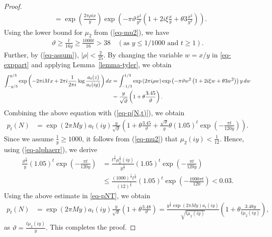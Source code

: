 \documentclass[11pt]{amsart}
\theoremstyle{plain}
\numberwithin{equation}{section}
\begin{document}
\begin{proof}
\begin{align}
			&=\exp\left(\frac{2\pi\rho ix}{y}\right)\exp\left(-\pi\vartheta\frac{x^{2}}{y^{2}}\left(1+2i\xi\frac{x}{y}+\theta 3\frac{x^{2}}{y^{2}}\right)\right).
		\end{align}
		Using the lower bound for $\mu_2$ from (\ref{eq-mu2}), we have
		\begin{align*}
			\vartheta\ge \frac{t}{16y}\ge \frac{1000t}{16}>38 \quad\left(\text{as $y\le 1/1000$ and $t\ge 1$}\right).
		\end{align*}
		Further, by (\ref{eq-assum}), $|\rho|<\frac{2}{25}$. By changing the variable $w=x/y$ in \eqref{eq-exppart} and applying Lemma~\ref{lemma-tyler}, we obtain
		\begin{align*}
			\notag
			\int_{-y/3}^{y/3}\exp\left(-2\pi i Mx+2\pi i\frac{1}{2\pi i}\log\frac{a_{t}(z)}{a_{t}(iy)}\right)dx&=\int_{-1/3}^{1/3}\exp\left(2\pi i\rho w\right)\exp\left(-\pi\vartheta w^{2}\left(1+2i\xi w+\theta 3w^{2}\right)\right)y\,dw\\
			&=\frac{y}{\sqrt{\vartheta}}\left(1+\theta\frac{3.45}{\vartheta}\right).
		\end{align*}
		Combining the above equation with (\ref{eq-p(N,t)}), we obtain 
		\begin{align}\label{eq-pNT}
			p_t(N) &=\exp(2\pi My)a_{t}(iy)\frac{y}{\sqrt{\vartheta}}\left(1+\theta\frac{3.45}{\vartheta}+\frac{\sqrt{\vartheta}}{y}\theta(1.05)^{t}\exp\left(-\frac{\pi t}{120y}\right)\right).
		\end{align}
		Since we assume $\frac{1}{y} \ge 1000$, it follows from (\ref{eq-mu2}) that $\mu_2(iy) < \frac{1}{12}$. Hence, using (\ref{eq-alphaerr}), we derive
		\begin{align*}
			\frac{\vartheta^{\frac{3}{2}}}{y}(1.05)^{t}\exp\left(-\frac{\pi t}{120y}\right)&= \frac{t^{\frac{3}{2}}\mu^{\frac{3}{2}}_2(iy)}{y^{\frac{5}{2}}}(1.05)^{t}\exp\left(-\frac{\pi t}{120y}\right)\\
			&\le \frac{(1000)^{\frac{5}{2}}t^{\frac{3}{2}}}{(12)^{\frac{3}{2}}}(1.05)^{t}\exp\left(-\frac{1000\pi t}{120}\right)<0.03.
		\end{align*}
		Using the above estimate in \eqref{eq-pNT}, we obtain
		\begin{align*}
			p_t(N)&=\exp\left(2\pi My\right)a_t(iy)\frac{y}{\sqrt{\vartheta}}\left(1+\theta\frac{3.48}{\vartheta}\right)
			=\frac{y^{\frac{3}{2}}\exp(2\pi My)a_{t}(iy)}{\sqrt{t\mu_{2}(iy)}}\left(1+\theta\frac{3.48y}{t\mu_2(iy)}\right),    
		\end{align*} 
		as $\vartheta=\frac{t\mu_{2}(iy)}{y}.$
		This completes the proof.
	\end{proof}
\end{document}
